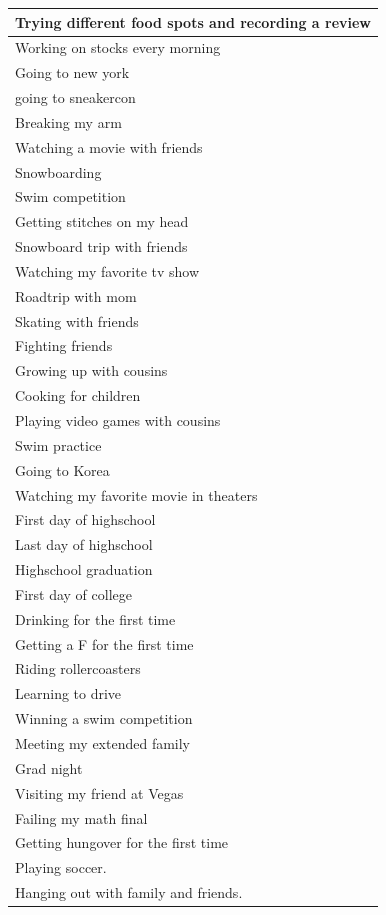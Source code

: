 \documentclass[
  .7em,
  letterpaper,
  DIV=11,
  numbers=noendperiod]{scrartcl}
\begin{document}
\begin{table}
\begin{tabular}{l}
\hline
Trying different food spots and recording a review\\
\hline
Working on stocks every morning\\
\hline
Going to new york\\
\hline
going to sneakercon\\
\hline
Breaking my arm\\
\hline
Watching a movie with friends\\
\hline
Snowboarding\\
\hline
Swim competition\\
\hline
Getting stitches on my head\\
\hline
Snowboard trip with friends\\
\hline
Watching my favorite tv show\\
\hline
Roadtrip with mom\\
\hline
Skating with friends\\
\hline
Fighting friends\\
\hline
Growing up with cousins\\
\hline
Cooking for children\\
\hline
Playing video games with cousins\\
\hline
Swim practice\\
\hline
Going to Korea\\
\hline
Watching my favorite movie in theaters\\
\hline
First day of highschool\\
\hline
Last day of highschool\\
\hline
Highschool graduation\\
\hline
First day of college\\
\hline
Drinking for the first time\\
\hline
Getting a F for the first time\\
\hline
Riding rollercoasters\\
\hline
Learning to drive\\
\hline
Winning a swim competition\\
\hline
Meeting my extended family\\
\hline
Grad night\\
\hline
Visiting my friend at Vegas\\
\hline
Failing my math final\\
\hline
Getting hungover for the first time\\
\hline
Playing soccer.\\
\hline
Hanging out with family and friends.\\

\end{tabular}
\end{table}
\end{document}
